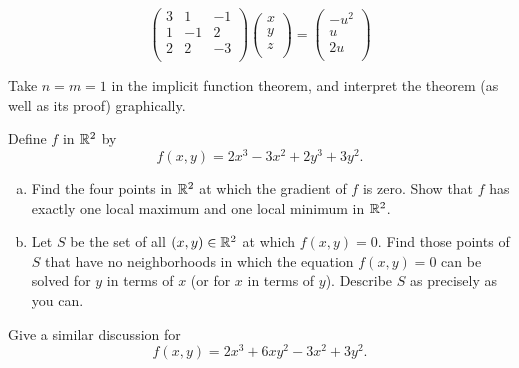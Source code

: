 \mySolve
\begin{equation*}
    \begin{pmatrix}
        3 &  1 & -1 \\
        1 & -1 &  2 \\
        2 &  2 & -3 \\
    \end{pmatrix}
    \begin{pmatrix}
        x \\ y \\ z \\
    \end{pmatrix} = 
    \begin{pmatrix}
        -u^2 \\ u \\ 2u \\
    \end{pmatrix}
\end{equation*}


\begin{myExercise}
    \label{ex:9.20}
    Take $n = m = 1$ in the implicit function theorem, and interpret the theorem (as well as its proof) graphically.
\end{myExercise}


\begin{myExercise}
    \label{ex:9.21}
    Define $f$ in ${\protect\mathbb R}^2$ by
    \begin{equation*}
        f(x,y) = 2x^3-3x^2+2y^3+3y^2.
    \end{equation*}
    \begin{enumerate}[(a)]
        \item Find the four points in ${\protect\mathbb R}^2$ at which the gradient of $f$ is zero. 
        Show that $f$ has exactly one local maximum and one local minimum in ${\protect\mathbb R}^2$.
        \item Let $S$ be the set of all $(x, y) \in {\protect\mathbb R}^2$ at which $f(x, y) = 0$. 
        Find those points of $S$ that have no neighborhoods in which the equation $f(x, y) = 0$ can be solved for $y$ in terms of $x$ 
        (or for $x$ in terms of $y$). 
        Describe $S$ as precisely as you can.
    \end{enumerate}
\end{myExercise}


\begin{myExercise}
    \label{ex:9.22}
    Give a similar discussion for
    \begin{equation*}
        f(x,y)=2x^3+6xy^2-3x^2+3y^2.
    \end{equation*}
\end{myExercise}


